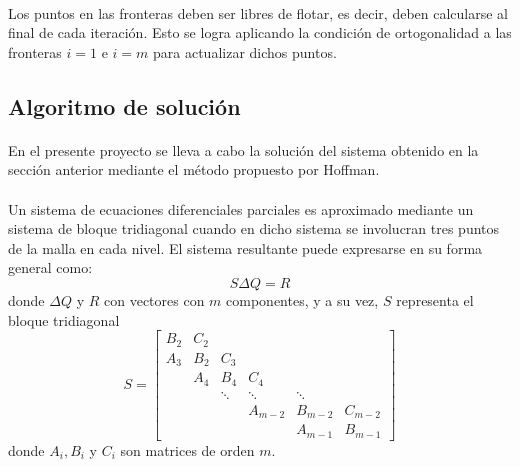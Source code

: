 \documentclass[letterpaper, openright, 12pt]{book}
\begin{document}
	\paragraph*{}
		Los puntos en las fronteras deben ser libres de flotar, es decir, deben calcularse al final de cada iteración. Esto se logra aplicando la condición de ortogonalidad a las fronteras $i = 1$ e $i = m$ para actualizar dichos puntos.
	
	\subsection{Algoritmo de solución}
	\paragraph*{}
		En el presente proyecto se lleva a cabo la solución del sistema obtenido en la sección anterior mediante el método propuesto por Hoffman\cite{hoffmann2000computational}.
	
	\paragraph*{}
		Un sistema de ecuaciones diferenciales parciales es aproximado mediante un sistema de bloque tridiagonal cuando en dicho sistema se involucran tres puntos de la malla en cada nivel. El sistema resultante puede expresarse en su forma general como:
		\begin{equation}
			S \Delta Q = R
			\label{hyper-sol-1}
		\end{equation}
		donde $\Delta Q$ y $R$ con vectores con $m$ componentes, y a su vez, $S$ representa el bloque tridiagonal
		\begin{equation*}
			S = \begin{bmatrix}
			B_2 & C_2\\
			A_3 & B_2 & C_3\\
			& A_4 & B_4 & C_4\\
			& & \ddots & \ddots & \ddots\\
			& & & A_{m-2} & B_{m-2} & C_{m-2}\\
			& & & & A_{m-1} & B_{m-1}
			\end{bmatrix}
		\end{equation*}
		donde $A_i, B_i$ y $C_i$ son matrices de orden $m$.
		
\end{document}
